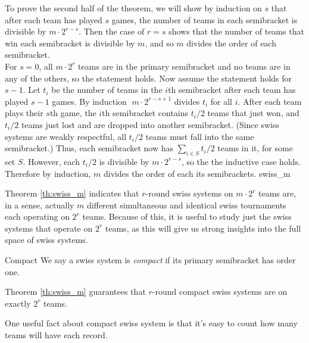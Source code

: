 {{        To prove the second half of the theorem, we will show by induction on $s$ that after each team has played $s$ games, the number of teams in each semibracket is divisible by $m \cdot 2^{r - s}.$ Then the case of $r = s$ shows that the number of teams that win each semibracket is divisible by $m$, and so $m$ divides the order of each semibracket.\\

        For $s = 0$, all $m \cdot 2^r$ teams are in the primary semibracket and no teams are in any of the others, so the statement holds. Now assume the statement holds for $s - 1$. Let $t_i$ be the number of teams in the $i$th semibracket after each team has played $s -1$ games. By induction $\; m \cdot 2^{r - s + 1}$ divides $t_i$ for all $i$. After each team plays their $s$th game, the $i$th semibracket contains $t_i/2$ teams that just won, and $t_i/2$ teams just lost and are dropped into another semibracket. (Since swiss systems are weakly respectful, all $t_i/2$ teams must fall into the same semibracket.) Thus, each semibracket now has $\sum_{i \in S} t_i / 2$ teams in it, for some set $S.$ However, each $t_i / 2$ is divisible by $m \cdot 2^{r - s}$, so the the inductive case holds.\\
        
        Therefore by induction, $m$ divides the order of each its semibrackets.
    }{swiss_m}

    Theorem \ref{th:swiss_m} indicates that $r$-round swiss systems on $m \cdot 2^r$ teams are, in a sense, actually $m$ different simultaneous and identical swiss tournaments each operating on $2^r$ teams. Because of this, it is useful to study just the swiss systems that operate on $2^r$ teams, as this will give us strong insights into the full space of swiss systems.

    \begin{definition}{Compact}{}
        We say a swiss system is \textit{compact} if its primary semibracket has order one.
    \end{definition}

    Theorem \ref{th:swiss_m} guarantees that $r$-round compact swiss systems are on exactly $2^r$ teams.

    One useful fact about compact swiss system is that it's easy to count how many teams will have each record.

    }
